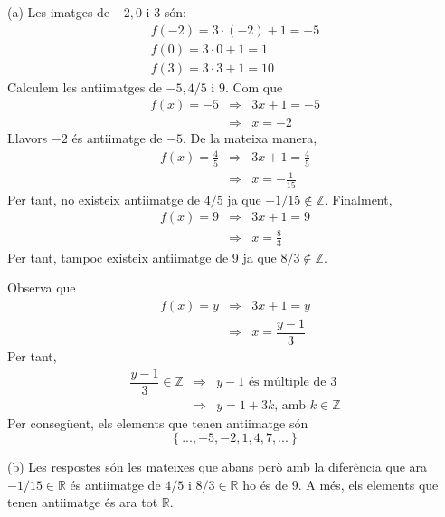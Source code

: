 \begin{solucio}
(a) Les imatges de $-2,0$ i $3$ són:%
\begin{equation*}
\begin{array}{l}
f(-2)=3\cdot \left( -2\right) +1=-5 \\
f(0)=3\cdot 0+1=1 \\
f(3)=3\cdot 3+1=10%
\end{array}%
\end{equation*}%
Calculem les antiimatges de $-5,4/5$ i $9$. Com que%
\begin{equation*}
\begin{array}{lll}
f(x)=-5 & \Longrightarrow & 3x+1=-5 \\
& \Longrightarrow & x=-2%
\end{array}%
\end{equation*}%
Llavors $-2$ és antiimatge de $-5$. De la mateixa manera,
\begin{equation*}
\begin{array}{lll}
f(x)=\frac{4}{5} & \Longrightarrow & 3x+1=\frac{4}{5} \\
& \Longrightarrow & x=-\frac{1}{15}%
\end{array}%
\end{equation*}%
Per tant, no existeix antiimatge de $4/5$ ja que $-1/15\notin \mathbb{Z}$.
Finalment,%
\begin{equation*}
\begin{array}{lll}
f(x)=9 & \Longrightarrow & 3x+1=9 \\
& \Longrightarrow & x=\frac{8}{3}%
\end{array}%
\end{equation*}%
Per tant, tampoc existeix antiimatge de $9$ ja que $8/3\notin \mathbb{Z}$.

Observa que%
\begin{equation*}
\begin{array}{lll}
f(x)=y & \Longrightarrow & 3x+1=y \\
& \Longrightarrow & x=\dfrac{y-1}{3}%
\end{array}%
\end{equation*}%
Per tant,%
\begin{equation*}
\begin{array}{lll}
\dfrac{y-1}{3}\in \mathbb{Z} & \Longrightarrow & y-1\text{ és múltiple de }3 \\
& \Longrightarrow & y=1+3k\text{, amb }k\in \mathbb{Z}%
\end{array}%
\end{equation*}%
Per consegüent, els elements que tenen antiimatge són%
\begin{equation*}
\left\{ ...,-5,-2,1,4,7,...\right\}
\end{equation*}

(b) Les respostes són les mateixes que abans però amb la diferència que ara $-1/15\in \mathbb{R}$ és antiimatge de $4/5$ i $8/3\in
\mathbb{R}$ ho és de $9$. A més, els elements que tenen antiimatge
és ara tot $\mathbb{R}$.
\end{solucio}


